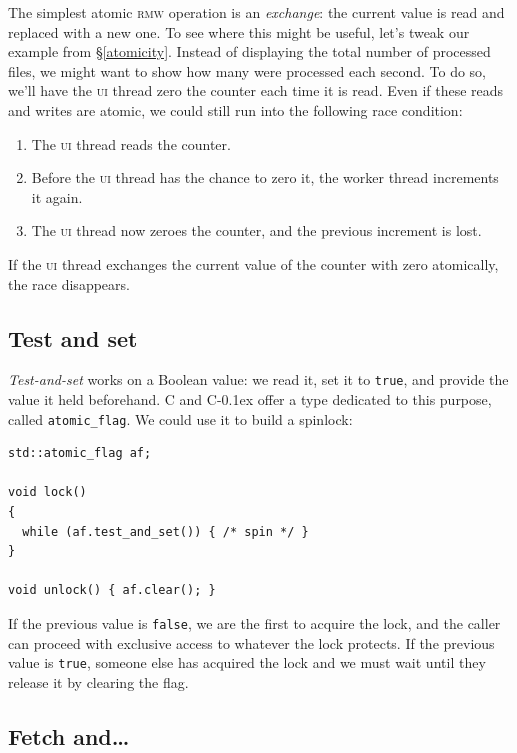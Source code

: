 \documentclass[fontsize=10pt, numbers=endperiod]{scrartcl}
\newcommand{\codesize}{\fontsize{10pt}{12pt}}
\newcommand{\monobox}[1]{\mbox{\texttt{#1}}}
\newcommand{\cpp}[1]{C\kern-0.1ex\raisebox{0.15ex}{\texttt{++}}{\addfontfeature{Numbers=LowercaseOff}#1}}
\newcommand{\introduce}[1]{\textit{#1}}
\newcommand{\secref}[1]{\hyperref[#1]{\textsc{\S}\ref*{#1}}}
\newenvironment{colfigure}
  {\par\vspace{1\baselineskip minus 0.5\baselineskip}\noindent\minipage{\linewidth}}
  {\endminipage\vspace*{1\baselineskip minus 0.7\baselineskip}}
\begin{document}
\begin{multicols}{2}
The simplest atomic \textsc{rmw} operation is an \introduce{exchange}:
the current value is read and replaced with a new one.
To see where this might be useful,
let's tweak our example from \secref{atomicity}.
Instead of displaying the total number of processed files,
we might want to show how many were processed each second.
To do so, we'll have the \textsc{ui} thread zero the counter each time it
is read.
Even if these reads and writes are atomic,
we could still run into the following race condition:
\begin{enumerate}
\item The \textsc{ui} thread reads the counter.
\item Before the \textsc{ui} thread has the chance to zero it,
    the worker thread increments it again.
\item The \textsc{ui} thread now zeroes the counter, and the previous increment
    is lost.
\end{enumerate}
If the \textsc{ui} thread exchanges the current
value of the counter with zero atomically, the race disappears.

\subsection{Test and set}

\introduce{Test-and-set} works on a Boolean value:
we read it, set it to \texttt{true}, and provide the value it
held beforehand.
C and \cpp{} offer a type dedicated to this purpose, called \monobox{atomic\_flag}.
We could use it to build a spinlock:
\label{spinlock}
\begin{colfigure}
\begin{verbatim}
std::atomic_flag af;

void lock()
{
  while (af.test_and_set()) { /* spin */ }
}

void unlock() { af.clear(); }
\end{verbatim}
\end{colfigure}
If the previous value is \texttt{false},
we are the first to acquire the lock,
and the caller can proceed with exclusive access to whatever the lock protects.
If the previous value is \texttt{true},
someone else has acquired the lock and we must
wait until they release it by clearing the flag.

\subsection{Fetch and…}


\end{multicols}
\end{document}
